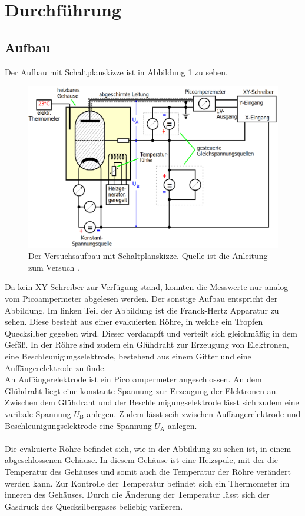 \section{Durchführung}
\label{sec:Durchführung}

\subsection{Aufbau}
Der Aufbau mit Schaltplanskizze ist in Abbildung \ref{fig:aufbau} zu sehen.
\begin{figure}
    \centering
    \includegraphics[width=\textwidth]{content/data/aufbau.png}
    \caption{Der Versuchsaufbau mit Schaltplanskizze. Quelle ist die Anleitung zum Versuch \cite[10]{anleitung}.}
    \label{fig:aufbau}
\end{figure}
Da kein XY-Schreiber zur Verfügung stand, konnten die Messwerte nur analog vom Picoampermeter abgelesen werden.
Der sonstige Aufbau entspricht der Abbildung.
Im linken Teil der Abbildung ist die Franck-Hertz Apparatur zu sehen.
Diese besteht aus einer evakuierten Röhre, in welche ein Tropfen Quecksilber gegeben wird.
Dieser verdampft und verteilt sich gleichmäßig in dem Gefäß.
In der Röhre sind zudem ein Glühdraht zur Erzeugung von Elektronen, eine Beschleunigungselektrode, bestehend aus einem Gitter und eine Auffängerelektrode zu finde.
\\
An Auffängerelektrode ist ein Piccoampermeter angeschlossen.
An dem Glühdraht liegt eine konstante Spannung zur Erzeugung der Elektronen an.
Zwischen dem Glühdraht und der Beschleunigungselektrode lässt sich zudem eine varibale Spannung $U_\text{B}$ anlegen.
Zudem lässt scih zwischen Auffängerelektrode und Beschleunigungselektrode eine Spannung $U_\text{A}$ anlegen.
\\\\
Die evakuierte Röhre befindet sich, wie in der Abbildung zu sehen ist, in einem abgeschlossenen Gehäuse.
In diesem Gehäuse ist eine Heizspule, mit der die Temperatur des Gehäuses und somit auch die Temperatur der Röhre verändert werden kann.
Zur Kontrolle der Temperatur befindet sich ein Thermometer im inneren des Gehäuses.
Durch die Änderung der Temperatur lässt sich der Gasdruck des Quecksilbergases beliebig variieren.


